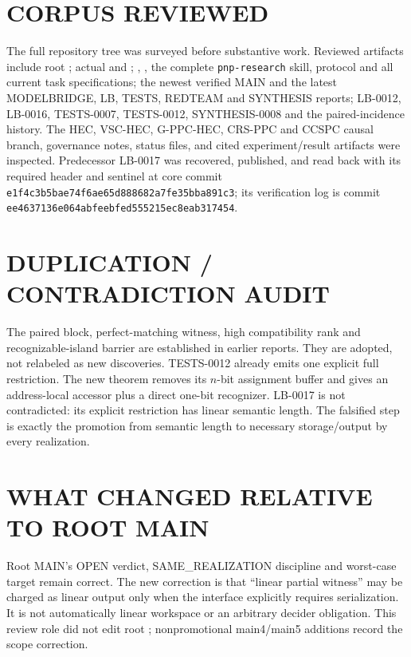 \documentclass[11pt]{article}
\begin{document}
\section{CORPUS REVIEWED}
The full repository tree was surveyed before substantive work.  Reviewed
artifacts include root ; actual  and
; , , the complete
\texttt{pnp-research} skill, protocol and all current task specifications;
the newest verified MAIN and the latest MODELBRIDGE, LB, TESTS, REDTEAM and
SYNTHESIS reports; LB-0012, LB-0016, TESTS-0007, TESTS-0012,
SYNTHESIS-0008 and the paired-incidence history.  The HEC, VSC-HEC,
G-PPC-HEC, CRS-PPC and CCSPC causal branch, governance notes, status files,
and cited experiment/result artifacts were inspected.  Predecessor LB-0017
was recovered, published, and read back with its required header and sentinel
at core commit \texttt{e1f4c3b5bae74f6ae65d888682a7fe35bba891c3}; its
verification log is commit
\texttt{ee4637136e064abfeebfed555215ec8eab317454}.

\section{DUPLICATION / CONTRADICTION AUDIT}
The paired block, perfect-matching witness, high compatibility rank and
recognizable-island barrier are established in earlier reports.  They are
adopted, not relabeled as new discoveries.  TESTS-0012 already emits one
explicit full restriction.  The new theorem removes its $n$-bit assignment
buffer and gives an address-local accessor plus a direct one-bit recognizer.
LB-0017 is not contradicted: its explicit restriction has linear semantic
length.  The falsified step is exactly the promotion from semantic length to
necessary storage/output by every realization.

\section{WHAT CHANGED RELATIVE TO ROOT MAIN}
Root MAIN's OPEN verdict, SAME\_REALIZATION discipline and worst-case target
remain correct.  The new correction is that ``linear partial witness'' may
be charged as linear output only when the interface explicitly requires
serialization.  It is not automatically linear workspace or an arbitrary
decider obligation.  This review role did not edit root ;
nonpromotional main4/main5 additions record the scope correction.
\end{document}
